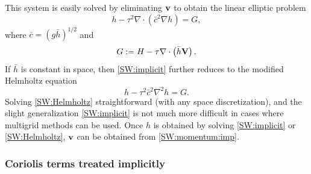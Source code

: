 \documentclass[12pt]{article}
\newcommand{\href}{\bar{h}}
\newcommand{\cbar}{\bar{c}}
\newcommand{\del}{\nabla}
\begin{document}
This system is easily solved by eliminating $\mathbf{v}$ to obtain the linear
elliptic problem
\begin{equation}
  h - \tau^2\del\cdot\left(\cbar^2\del h\right) = G ,
\label{SW:implicit}
\end{equation}
where $\cbar=\left(g\href\right)^{1/2}$ and
\begin{equation}
 G := H - \tau \del\cdot\left(\href \vecV\right) .
\end{equation}
If $\href$ is constant in space, then \eqref{SW:implicit}
further reduces to the modified Helmholtz equation
\begin{equation}
  h - \tau^2\cbar^2\del^2 h = G .
\label{SW:Helmholtz}
\end{equation}
Solving \eqref{SW:Helmholtz} straightforward (with any space discretization),
and the slight generalization \eqref{SW:implicit} is not much more
difficult in cases where multigrid methods can be used.  Once $h$ is
obtained by solving \eqref{SW:implicit} or \eqref{SW:Helmholtz},
$\mathbf{v}$ can be obtained from \eqref{SW:momentum:imp}.

\pagebreak[2]
\subsubsection{Coriolis terms treated implicitly}
\end{document}
